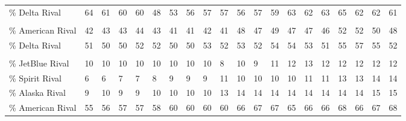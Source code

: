 \begin{tabular}[t]{llllllllllllllllllll}
\hspace{1em}\% Delta Rival & 64 & 61 & 60 & 60 & 48 & 53 & 56 & 57 & 57 & 56 & 57 & 59 & 63 & 62 & 63 & 65 & 62 & 62 & 61\\
\addlinespace[0.3em]
\multicolumn{20}{l}{\textbf{Alaska}}\\
\hspace{1em}\% American Rival & 42 & 43 & 43 & 44 & 43 & 41 & 41 & 42 & 41 & 48 & 47 & 49 & 47 & 47 & 46 & 52 & 52 & 50 & 48\\
\hspace{1em}\% Delta Rival & 51 & 50 & 50 & 52 & 52 & 50 & 50 & 53 & 52 & 53 & 52 & 54 & 54 & 53 & 51 & 55 & 57 & 55 & 52\\
\addlinespace[0.3em]
\multicolumn{20}{l}{\textbf{Delta}}\\
\hspace{1em}\% JetBlue Rival & 10 & 10 & 10 & 10 & 10 & 10 & 10 & 10 & 8 & 10 & 9 & 11 & 12 & 13 & 12 & 12 & 12 & 12 & 12\\
\hspace{1em}\% Spirit Rival & 6 & 6 & 7 & 7 & 8 & 9 & 9 & 9 & 11 & 10 & 10 & 10 & 10 & 11 & 11 & 13 & 13 & 14 & 14\\
\hspace{1em}\% Alaska Rival & 9 & 10 & 9 & 9 & 10 & 10 & 10 & 10 & 13 & 14 & 14 & 14 & 14 & 14 & 14 & 14 & 14 & 15 & 15\\
\hspace{1em}\% American Rival & 55 & 56 & 57 & 57 & 58 & 60 & 60 & 60 & 60 & 66 & 67 & 67 & 65 & 66 & 66 & 68 & 66 & 67 & 68\\
\bottomrule
\end{tabular}

